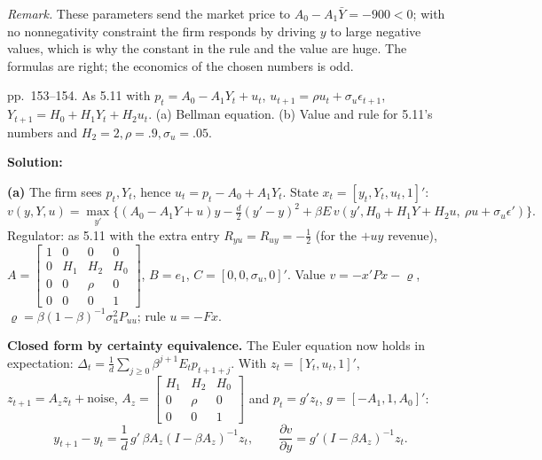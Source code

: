\documentclass[12pt, letterpaper]{article}
\begin{document}
\begin{tcolorbox}[oddbox,title={Exercise 5.11 \quad Firm-level adjustment costs}]
\emph{Remark.} These parameters send the market price to $A_0-A_1\bar Y=-900<0$; with no
nonnegativity constraint the firm responds by driving $y$ to large negative values, which is why the
constant in the rule and the value are huge. The formulas are right; the economics of the chosen
numbers is odd.
\end{tcolorbox}

\begin{tcolorbox}[evenbox,title={Exercise 5.12 \quad Adjustment costs with a demand shock}]
\begin{tcolorbox}[questionbox]
pp.~153--154. As 5.11 with $p_t=A_0-A_1Y_t+u_t$, $u_{t+1}=\rho u_t+\sigma_u\epsilon_{t+1}$,
$Y_{t+1}=H_0+H_1Y_t+H_2u_t$. (a) Bellman equation. (b) Value and rule for 5.11's numbers and
$H_2=2,\rho=.9,\sigma_u=.05$.
\end{tcolorbox}

\textbf{Solution:}

\textbf{(a)} The firm sees $p_t,Y_t$, hence $u_t=p_t-A_0+A_1Y_t$. State $x_t=[y_t,Y_t,u_t,1]'$:
\[
v(y,Y,u)=\max_{y'}\big\{(A_0-A_1Y+u)y-\tfrac d2(y'-y)^2+\beta E\,v(y',H_0+H_1Y+H_2u,\ \rho u+\sigma_u\epsilon')\big\}.
\]
Regulator: as 5.11 with the extra entry $R_{yu}=R_{uy}=-\tfrac12$ (for the $+uy$ revenue),
$A=\begin{bmatrix}1&0&0&0\\0&H_1&H_2&H_0\\0&0&\rho&0\\0&0&0&1\end{bmatrix}$, $B=e_1$,
$C=[0,0,\sigma_u,0]'$. Value $v=-x'Px-\varrho$, $\varrho=\beta(1-\beta)^{-1}\sigma_u^2P_{uu}$; rule $u=-Fx$.

\textbf{Closed form by certainty equivalence.} The Euler equation now holds in expectation:
$\Delta_t=\frac1d\sum_{j\ge0}\beta^{j+1}E_tp_{t+1+j}$. With $z_t=[Y_t,u_t,1]'$,
$z_{t+1}=A_zz_t+\text{noise}$, $A_z=\begin{bmatrix}H_1&H_2&H_0\\0&\rho&0\\0&0&1\end{bmatrix}$ and
$p_t=g'z_t$, $g=[-A_1,1,A_0]'$:
\[
\boxed{y_{t+1}-y_t=\frac1d\,g'\,\beta A_z(I-\beta A_z)^{-1}z_t,}\qquad
\frac{\partial v}{\partial y}=g'(I-\beta A_z)^{-1}z_t .
\]


\end{tcolorbox}
\end{document}
